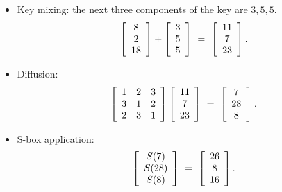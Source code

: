 \documentclass{ximera}
\begin{document}
\begin{solution}
  \begin{itemize}
  \item Key mixing: the next three components of the key are
    $3,5,5$.
    \begin{equation*}
      \startmat{c} 8 \\ 2 \\ 18 \stopmat
      +
      \startmat{c} 3 \\ 5 \\ 5 \stopmat
      ~=~
      \startmat{c} 11 \\ 7 \\ 23 \stopmat.
    \end{equation*}
  \item Diffusion:
    \begin{equation*}
      \startmat{ccc}
        1 & 2 & 3 \\
        3 & 1 & 2 \\
        2 & 3 & 1 \\
      \stopmat
      \startmat{c} 11 \\ 7 \\ 23 \stopmat
      ~=~
      \startmat{c} 7 \\ 28 \\ 8 \stopmat.
    \end{equation*}
  \item S-box application:
    \begin{equation*}
      \startmat{c} S(7) \\ S(28) \\ S(8) \stopmat
      ~=~
      \startmat{c} 26 \\ 8 \\ 16 \stopmat.
    \end{equation*}
  \end{itemize}


\end{solution}
\end{document}
